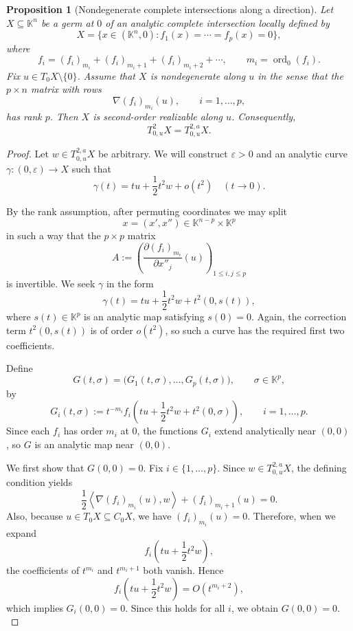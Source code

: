 \documentclass[10pt,reqno]{amsart}
\theoremstyle{break-italic}
\theoremstyle{break-italic}
\theoremstyle{break-italic}
\theoremstyle{break-italic}
\theoremstyle{break-italic}
\theoremstyle{break-italic}
\theoremstyle{break-italic}
\theoremstyle{break-italic}
\newtheorem{Proposition}[satz]{Proposition}
\theoremstyle{break-roman}
\theoremstyle{standard}
\theoremstyle{varthm-roman}
\theoremstyle{varthm-italic}
\theoremstyle{varthm-roman-break}
\theoremstyle{varthm-italic-break}
\theoremstyle{varthm-roman-no-punctuation}
\theoremstyle{varthm-italic-no-punctuation}
\numberwithin{equation}{section}
\begin{document}
\begin{Proposition}[Nondegenerate complete intersections along a direction]\label{prop:ci-realizable}
Let $X\subseteq \mathbb K^n$ be a germ at $0$ of an analytic complete
intersection locally defined by
\[
X=\{x\in (\mathbb K^n,0): f_1(x)=\cdots=f_p(x)=0\},
\]
where
\[
f_i=(f_i)_{m_i}+(f_i)_{m_i+1}+(f_i)_{m_i+2}+\cdots,
\qquad m_i=\operatorname{ord}_0(f_i).
\]
Fix $u\in T_0X\setminus\{0\}$. Assume that $X$ is nondegenerate along $u$ in the
sense that the $p\times n$ matrix with rows
\[
\nabla (f_i)_{m_i}(u),\qquad i=1,\dots,p,
\]
has rank $p$. Then $X$ is second-order realizable along $u$. Consequently,
\[
T^2_{0,u}X=T^{2,a}_{0,u}X.
\]
\end{Proposition}

\begin{proof}
Let $w\in T^{2,a}_{0,u}X$ be arbitrary. We will construct $\varepsilon>0$ and an
analytic curve
\(
\gamma:(0,\varepsilon)\to X
\)
such that
\[
\gamma(t)=tu+\frac12 t^2w+o(t^2)
\quad (t\to 0).
\]

By the rank assumption, after permuting coordinates we may split
\[
x=(x',x'')\in \mathbb K^{n-p}\times \mathbb K^p
\]
in such a way that the $p\times p$ matrix
\[
A:=
\left(
\frac{\partial (f_i)_{m_i}}{\partial x''_j}(u)
\right)_{1\le i,j\le p}
\]
is invertible. 
We seek $\gamma$ in the form
\[
\gamma(t)=tu+\frac12 t^2w+t^2(0,s(t)),
\]
where $s(t)\in \mathbb K^p$ is an analytic map satisfying $s(0)=0$. Again, the
correction term $t^2(0,s(t))$ is of order $o(t^2)$, so such a curve has the
required first two coefficients.

Define
\[
G(t,\sigma)
=
\bigl(G_1(t,\sigma),\dots,G_p(t,\sigma)\bigr),
\qquad \sigma\in \mathbb K^p,
\]
by
\[
G_i(t,\sigma)
:=
t^{-m_i}f_i\!\left(tu+\frac12 t^2w+t^2(0,\sigma)\right),
\qquad i=1,\dots,p.
\]
Since each $f_i$ has order $m_i$ at $0$, the functions $G_i$ extend
analytically near $(0,0)$, so $G$ is an analytic map near $(0,0)$.

We first show that
\(
G(0,0)=0.
\)
Fix $i\in\{1,\dots,p\}$. Since $w\in T^{2,a}_{0,u}X$, the defining condition
yields
\[
\frac12\left\langle \nabla (f_i)_{m_i}(u),w\right\rangle +(f_i)_{m_i+1}(u)=0.
\]
Also, because $u\in T_0X\subseteq C_0X$, we have
\(
(f_i)_{m_i}(u)=0.
\)
Therefore, when we expand
\[
f_i\!\left(tu+\frac12 t^2w\right),
\]
the coefficients of $t^{m_i}$ and $t^{m_i+1}$ both vanish. Hence
\[
f_i\!\left(tu+\frac12 t^2w\right)=O(t^{m_i+2}),
\]
which implies
\(
G_i(0,0)=0.
\)
Since this holds for all $i$, we obtain
\(
G(0,0)=0.
\)


\end{proof}
\end{document}
